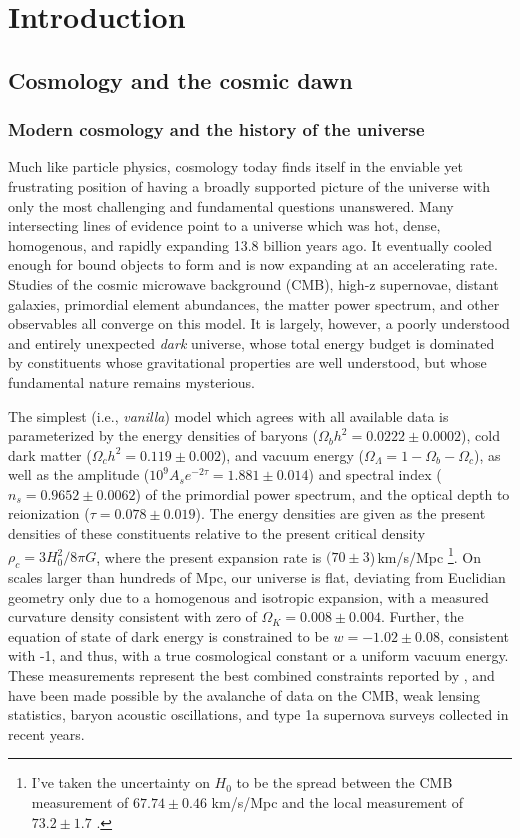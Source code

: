 \chapter{Introduction}


\section{Cosmology and the cosmic dawn}

\subsection{Modern cosmology and the history of the universe}

Much like particle physics, cosmology today finds itself in the enviable yet frustrating position of having a broadly supported picture of the universe with only the most challenging and fundamental questions unanswered. Many intersecting lines of evidence point to a universe which was hot, dense, homogenous, and rapidly expanding 13.8 billion years ago. It eventually cooled enough for bound objects to form and is now expanding at an accelerating rate. Studies of the cosmic microwave background (CMB), high-z supernovae, distant galaxies, primordial element abundances, the matter power spectrum, and other observables all converge on this model. It is largely, however, a poorly understood and entirely unexpected \textit{dark} universe, whose total energy budget is dominated by constituents whose gravitational properties are well understood, but whose fundamental nature remains mysterious. 

The simplest (i.e., \textit{vanilla}) model which agrees with all available data is parameterized by the energy densities of baryons ($\Omega_bh^2=0.0222\pm0.0002$), cold dark matter  ($\Omega_ch^2=0.119\pm0.002$), and vacuum energy ($\Omega_\Lambda=1-\Omega_b-\Omega_c$), as well as the amplitude ($10^{9}A_se^{-2\tau}=1.881\pm0.014$) and spectral index ($n_s=0.9652\pm0.0062$) of the primordial power spectrum, and the optical depth to reionization ($\tau=0.078\pm0.019$). 
The energy densities are given as the present densities of these constituents relative to the present critical density $\rho_c=3H_0^2/8\pi G$, where the present expansion rate is $(70\pm3$)\,km/s/Mpc
\footnote{I've taken the uncertainty on $H_0$ to be the spread between the CMB measurement of $67.74\pm0.46$ km/s/Mpc \citep{planck16} and the local measurement of $73.2\pm1.7$ \citep{reiss16}.}. 
On scales larger than hundreds of Mpc, our universe is flat, deviating from Euclidian geometry only due to a homogenous and isotropic expansion, with a measured curvature density consistent with zero of $\Omega_K=0.008\pm0.004$. 
Further, the equation of state of dark energy is constrained to be $w=-1.02\pm0.08$, consistent with -1, and thus, with a true cosmological constant or a uniform vacuum energy. These measurements represent the best combined constraints reported by \citet{planck16}, and have been made possible by the avalanche of data on the CMB, weak lensing statistics, baryon acoustic oscillations, and type 1a supernova surveys collected in recent years. 

